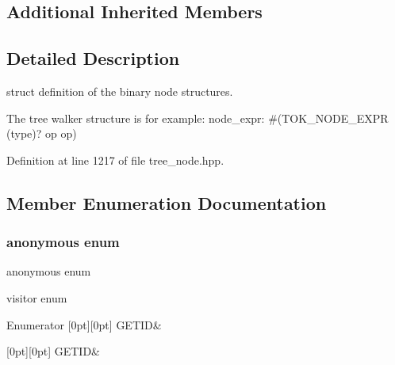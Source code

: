 \subsection*{Additional Inherited Members}


\subsection{Detailed Description}
struct definition of the binary node structures. 

The tree walker structure is for example\+: node\+\_\+expr\+: \#(T\+O\+K\+\_\+\+N\+O\+D\+E\+\_\+\+E\+X\+PR (type)? op op) 

Definition at line 1217 of file tree\+\_\+node.\+hpp.



\subsection{Member Enumeration Documentation}
\mbox{\label{structbinary__expr_ae3c6b9e3fe6c04e0a87243c7ac3cff09}} 
\subsubsection{\texorpdfstring{anonymous enum}{anonymous enum}}
{\footnotesize\ttfamily anonymous enum}



visitor enum 

\begin{DoxyEnumFields}{Enumerator}
[0pt][0pt]{}\mbox{\label{structbinary__expr_ae3c6b9e3fe6c04e0a87243c7ac3cff09aa82e7a81bd257ea6b0ed1e39994ffee8}} 
G\+E\+T\+ID&\\
\hline

[0pt][0pt]{}\mbox{\label{structbinary__expr_ae3c6b9e3fe6c04e0a87243c7ac3cff09aa82e7a81bd257ea6b0ed1e39994ffee8}} 
G\+E\+T\+ID&\\
\hline

\end{DoxyEnumFields}


